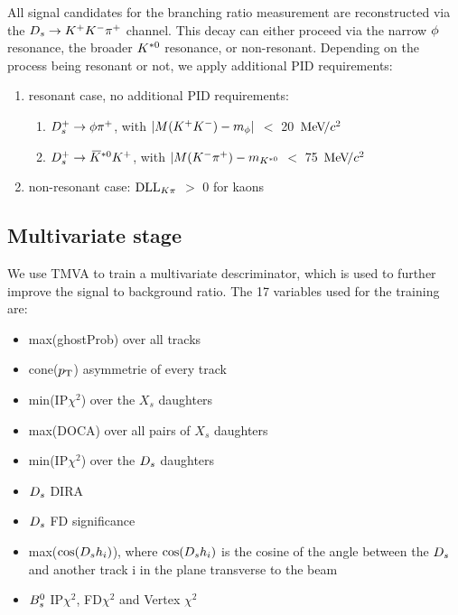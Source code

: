 All signal candidates for the branching ratio measurement are reconstructed via the ${{D}_{s}}\rightarrow{\ensuremath{{K}^+}}{\ensuremath{{K}^-}}{\ensuremath{{\pi}^+}}$ channel. This decay can either proceed via the narrow $\phi$ resonance, the broader ${{K}^{*0}}$ resonance, or non-resonant.
Depending on the process being resonant or not, we apply additional PID requirements:

\begin{enumerate}

\item resonant case, no additional PID requirements:
\begin{enumerate}
\item ${{D}^+_{s}}\rightarrow\phi{\ensuremath{{\pi}^+}}$, with $|M({{K}^+}{{K}^-}) - m_{\phi}|$ $<$ 20 ${\mathrm{\,Me\kern -0.1em V\!/}c^2}$  
\item ${{D}^+_{s}}\rightarrow{\ensuremath{{\kern 0.2em\overline{\kern -0.2em K}{}}{}^{*0}}}{\ensuremath{{K}^+}}$, with  $|M({{K}^-}{{\pi}^+}) -m_{{{K}^{*0}}}$ $<$ 75 ${\mathrm{\,Me\kern -0.1em V\!/}c^2}$
\end{enumerate}

\item non-resonant case: $\mathrm{DLL}_{{K}{\pi}}$ $>$ 0 for kaons

\end{enumerate}




\subsection{Multivariate stage}

We use TMVA \cite{Hocker:2007ht} to train a multivariate descriminator, which is used to further improve the signal to background ratio. The 17 variables used for the training are:

\begin{itemize} 

\item max(ghostProb) over all tracks

\item cone($\mbox{$p_{\mathrm{ T}}$}$) asymmetrie of every track

\item min(IP$\chi^{2}$) over the $X_{s}$ daughters

\item max(DOCA) over all pairs of $X_{s}$ daughters

\item min(IP$\chi^{2}$) over the ${{D}_{s}}$ daughters

\item ${{D}_{s}}$ DIRA

\item ${{D}_{s}}$ FD significance

\item max($\cos({{D}_{s}} h_{i})$), where $\cos({{D}_{s}} h_{i})$ is the cosine of the angle between the ${{D}_{s}}$ and another track i in the plane transverse to the beam

\item ${{B}^0_{s}}$ IP$\chi^{2}$, FD$\chi^{2}$ and Vertex $\chi^{2}$

\end{itemize}

